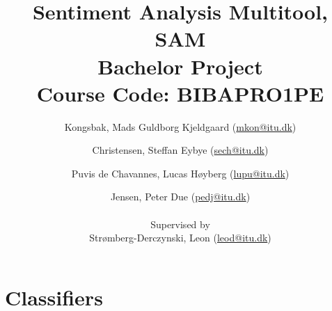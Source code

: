 \documentclass[a4paper]{article}
\title{
	Sentiment Analysis Multitool, SAM \\
	\small
	Bachelor Project \\
	Course Code: BIBAPRO1PE
}
\author{
	Kongsbak, Mads Guldborg Kjeldgaard
	(\href{mailto:mkon@itu.dk}{mkon@itu.dk}) 
	\and
	Christensen, Steffan Eybye
	(\href{mailto:sech@itu.dk}{sech@itu.dk})
	\and
	Puvis de Chavannes, Lucas Høyberg
	(\href{mailto:lupu@itu.dk}{lupu@itu.dk})
	\and
	Jensen, Peter Due
	(\href{mailto:pedj@itu.dk}{pedj@itu.dk})\\\\
	Supervised by \\
	Strømberg-Derczynski, Leon
	(\href{mailto:leod@itu.dk}{leod@itu.dk})
}
\begin{document}
\renewcommand\thesection{\Roman{section}}
\renewcommand\thesubsection{\thesection.\Roman{subsection}}

\maketitle
\pagebreak



\newpage

\setcounter{tocdepth}{2}
\tableofcontents

\clearpage
\newpage
\clearpage


\renewcommand\thesection{\arabic{section}}
\renewcommand\thesubsection{\thesection.\arabic{subsection}}
\setcounter{section}{0}


\newpage


\newpage



\newpage



\newpage


\section{Classifiers} \label{Classifiers}





\newpage
\end{document}
